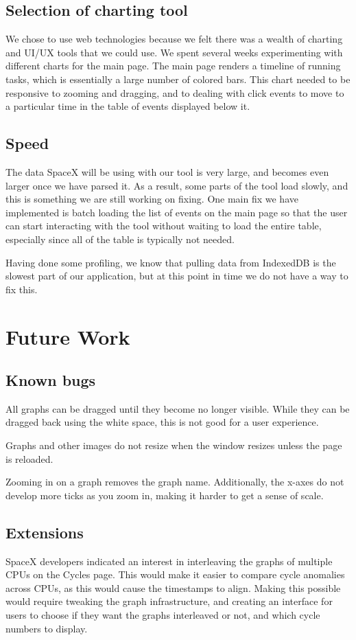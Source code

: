 \documentclass{hmcclinic}
\begin{document}
\section{Selection of charting tool} %
  We chose to use web technologies because we felt there was a wealth of
  charting and UI/UX tools that we could use. We spent several weeks
  experimenting with different charts for the main page. The main page renders a
  timeline of running tasks, which is essentially a large number of colored
  bars. This chart needed to be responsive to zooming and dragging, and to
  dealing with click events to move to a particular time in the table of events
  displayed below it.
\section{Speed} %
The data SpaceX will be using with our tool is very large, and becomes even
larger once we have parsed it. As a result, some parts of the tool load slowly,
and this is something we are still working on fixing. One main fix we have
implemented is batch loading the list of events on the main page so that the
user can start interacting with the tool without waiting to load the entire
table, especially since all of the table is typically not needed.

Having done some profiling, we know that pulling data from IndexedDB is the
slowest part of our application, but at this point in time we do not have a way
to fix this.

\chapter{Future Work}
\section{Known bugs}
  
All graphs can be dragged until they become no longer visible. While they can
be dragged back using the white space, this is not good for a user experience.

Graphs and other images do not resize when the window resizes unless the page
is reloaded.

Zooming in on a graph removes the graph name. Additionally, the x-axes do not
develop more ticks as you zoom in, making it harder to get a sense of scale.

\section{Extensions}
  SpaceX developers indicated an interest in interleaving the graphs of multiple
  CPUs on the Cycles page.  This would make it easier to compare cycle
  anomalies across CPUs, as this would cause the timestamps to align. Making
  this possible would require tweaking the graph infrastructure, and creating an
  interface for users to choose if they want the graphs interleaved or not, and
  which cycle numbers to display.
\end{document}
